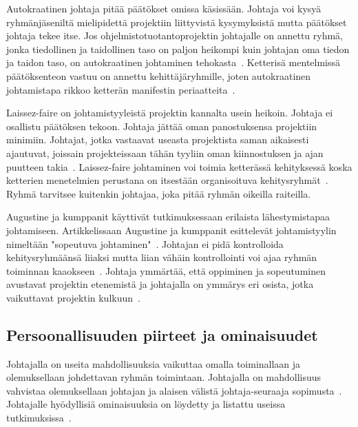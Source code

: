 \documentclass[finnish]{tktltiki2}
\theoremstyle{definition}
\theoremstyle{remark}
\begin{document}
Autokraatinen johtaja pitää päätökset omissa käsissään. Johtaja voi kysyä ryhmänjäseniltä mielipidettä projektiin liittyvistä kysymyksistä mutta päätökset johtaja tekee itse. Jos ohjelmistotuotantoprojektin johtajalle on annettu ryhmä, jonka tiedollinen ja taidollinen taso on paljon heikompi kuin johtajan oma tiedon ja taidon taso, on autokraatinen johtaminen tehokasta~\cite{Dhomne:2012:ITL:2382887.2382899}. Ketterisä mentelmissä päätöksenteon vastuu on annettu kehittäjäryhmille, joten autokraatinen johtamistapa rikkoo ketterän manifestin periaatteita~\cite{fowler2001agile}.

Laissez-faire on johtamistyyleistä projektin kannalta usein heikoin. Johtaja ei osallistu päätöksen tekoon. Johtaja jättää oman panostuksensa projektiin minimiin. Johtajat, jotka vastaavat useasta projektista saman aikaisesti ajautuvat, joissain projekteissaan tähän tyyliin oman kiinnostuksen ja ajan puutteen takia~\cite{Dhomne:2012:ITL:2382887.2382899}. Laissez-faire johtaminen voi toimia ketterässä kehityksessä koska ketterien menetelmien perustana on itsestään organisoituva kehitysryhmät~\cite{fowler2001agile}. Ryhmä tarvitsee kuitenkin johtajaa, joka pitää ryhmän oikeilla raiteilla.

Augustine ja kumppanit käyttivät tutkimuksessaan erilaista lähestymistapaa johtamiseen. Artikkelissaan Augustine ja kumppanit esittelevät johtamistyylin nimeltään "sopeutuva johtaminen"~\cite{Augustine:2005:APM:1101779.1101781}. Johtajan ei pidä kontrolloida kehitysryhmäänsä liiaksi mutta liian vähäin kontrollointi voi ajaa ryhmän toiminnan kaaokseen~\cite{Augustine:2005:APM:1101779.1101781}. Johtaja ymmärtää, että oppiminen ja sopeutuminen avustavat projektin etenemistä ja johtajalla on ymmärys eri osista, jotka vaikuttavat projektin kulkuun~\cite{Augustine:2005:APM:1101779.1101781}. 





\subsection{Persoonallisuuden piirteet ja ominaisuudet}

Johtajalla on useita mahdollisuuksia vaikuttaa omalla toiminallaan ja olemuksellaan johdettavan ryhmän toimintaan. Johtajalla on mahdollisuus vahvistaa olemuksellaan johtajan ja alaisen välistä johtaja-seuraaja sopimusta~\cite{raccoon2006leadership}. Johtajalle hyödyllisiä ominaisuuksia on löydetty ja listattu useissa tutkimuksissa~\cite{raccoon2006leadership, Wang:2009:PMP:1639950.1640049, bradley1997effect, 4017705}. 
\end{document}
